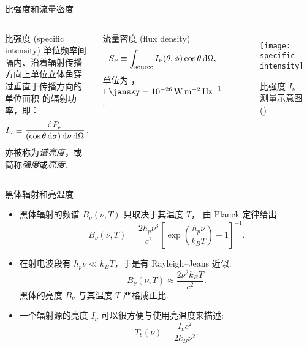 \documentclass{beamer}
\begin{document}
\begin{frame}{比强度和流量密度}
  \begin{columns}
      \begin{alertblock}{比强度 (specific intensity)}
        \smallskip
        单位频率间隔内、沿着辐射传播方向上单位立体角穿过垂直于传播方向的单位面积
        的辐射功率，即：
        \begin{equation}
          I_{\nu} \equiv
            \frac{\text{d}P_{\nu}}{(\cos\theta\,\text{d}\sigma)
              \,\text{d}\nu \,\text{d}\Omega} \,,
        \end{equation}
        亦被称为\emph{谱亮度}，或简称\emph{强度}或\emph{亮度}.
      \end{alertblock}

      \begin{alertblock}{流量密度 (flux density)}
        \smallskip
        \begin{equation}
          S_{\nu} \equiv
            \int_{\text{source}} I_{\nu}(\theta,\phi) \cos\theta \,\text{d}\Omega ,
        \end{equation}
        单位为 \si{\jansky}，
        $\SI{1}{\jansky} = \SI{e-26}{\watt\per\square\meter\per\hertz}$.
      \end{alertblock}

      \begin{figure}
        \centering
        \texttt{[image: specific-intensity]}
        \caption{比强度 $I_{\nu}$ 测量示意图 (\cite{condon2016})}
      \end{figure}
  \end{columns}
\end{frame}

\begin{frame}{黑体辐射和亮温度}
  \begin{itemize}
    \item \alert{黑体辐射}的频谱 $B_{\nu}(\nu, T)$ 只取决于其温度 $T$，
      由 \alert{Planck 定律}给出:
      \begin{equation}
        B_{\nu}(\nu, T) =
          \frac{2 h_p \nu^3}{c^2} \left[ \exp\left(
            \frac{h_p \nu}{k_B T} \right) - 1 \right]^{-1} .
      \end{equation}
    \item 在射电波段有 $h_p \nu \ll k_B T$，于是有 \alert{Rayleigh--Jeans 近似}:
      \begin{equation}
        B_{\nu}(\nu, T) \approx \frac{2 \nu^2 k_B T}{c^2} .
      \end{equation}
      黑体的亮度 $B_{\nu}$ 与其温度 $T$ 严格成正比.
    \item 一个辐射源的亮度 $I_{\nu}$ 可以很方便与使用\alert{亮温度}来描述:
      \begin{equation}
        T_b(\nu) \equiv \frac{I_{\nu} c^2}{2 k_B \nu^2} .
      \end{equation}
  \end{itemize}
\end{frame}
\end{document}
